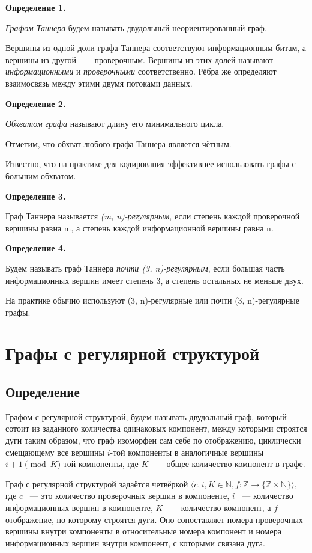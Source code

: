 \documentclass[14pt]{mmcs_article}
\begin{document}
\textbf{Определение 1.}

\textsl{Графом Таннера} будем называть двудольный неориентированный граф.

Вершины из одной доли графа Таннера соответствуют информационным битам, а вершины из другой ~--- проверочным. Вершины из этих долей называют \textsl{информационными} и \textsl{проверочными} соответственно. Рёбра же определяют взаимосвязь между этими двумя потоками данных.

\textbf{Определение 2.}

\textsl{Обхватом графа} называют длину его минимального цикла.

Отметим, что обхват любого графа Таннера является чётным.

Известно, что на практике для кодирования эффективнее использовать графы с большим обхватом.

\textbf{Определение 3.}

Граф Таннера называется \textsl{(m, n)-регулярным}, если степень каждой проверочной вершины равна m, а степень каждой информационной вершины равна n.

\textbf{Определение 4.}

Будем называть граф Таннера \textsl{почти (3, n)-регулярным}, если большая часть информационных вершин имеет степень 3, а степень остальных не меньше двух.

На практике обычно используют (3, n)-регулярные или почти (3, n)-регулярные графы.

\newpage
\section{Графы с регулярной структурой}

\subsection{Определение}

Графом с регулярной структурой, будем называть двудольный граф, который сотоит из заданного количества одинаковых компонент, между которыми строятся дуги таким образом, что граф изоморфен сам себе по отображению, циклически смещающему все вершины $i$-той компоненты в аналогичные вершины $i + 1 \pmod K$-той компоненты, где $K$ ~--- общее количество компонент в графе.

Граф с регулярной структурой задаётся четвёркой $\langle c, i, K \in \mathbb{N}, f: \mathbb{Z} \rightarrow \{ \mathbb{Z} \times \mathbb{N} \} \rangle$, где $c$ ~--- это количество проверочных вершин в компоненте, $i$ ~--- количество информационных вершин в компоненте, $K$ ~--- количество компонент, а $f$ ~--- отображение, по которому строятся дуги. Оно сопоставляет номера проверочных вершины внутри компоненты в относительные номера компонент и номера информационных вершин внутри компонент, с которыми связана дуга.
\end{document}
